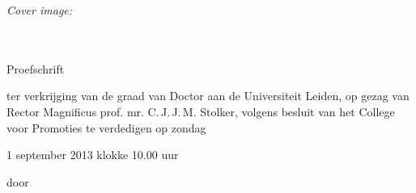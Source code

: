 \ifdefined\thesiscoverimgdesc%
\emph{Cover image:} \thesiscoverimgdesc\\
\fi
\clearpage


\begin{center}
  {
    {\Huge \thesistitle }\\[1em]
    {\huge \thesissubtitle }\\[5em]
    {\Large Proefschrift}\\[5em]
    {\Large \parbox{0.59 \textwidth}{ter verkrijging van de graad van Doctor aan de Universiteit Leiden, op gezag van Rector Magnificus prof\@. mr\@. C.\,J.\,J.\,M\@. Stolker,
volgens besluit van het College voor Promoties
te verdedigen op zondag \linebreak\centerline{1 september 2013 klokke 10.00 uur}}}\vfill
	{\Large door}\\[3em]
	{\parbox[c][][c]{0.65 \textwidth}{\centering\Large\thesisauthor\\ \thesisauthorborn}}
  }
\end{center}

\clearpage

{%
\large%
\hspace{3.6cm}\parbox[t]{0.7\textwidth}{%
\thesispromotores}\\[1cm]
}
{%
\ifdefined\thesiscomittee%
\large%
\hspace{3.6cm}\parbox[t]{0.7\textwidth}{%
\thesiscomittee}
\fi
}
\vfill

{\thesisfunding}

\clearpage


\begin{center}
  \vspace*{0.25\textheight}
  
  \emph{\thesisproverb}
  
  \vspace*{0.5\textheight}

  \emph{\thesisdedication}
\end{center}


\thesisgeometry
\checkandfixthelayout
\makeatletter
\ch@ngetext
\makeatletter
\cleardoublepage

\hypersetup{pageanchor=true}

\setcounter{tocdepth}{1}
\hypertarget{thesistoc}{}
\tableofcontents

\pagestyle{thesisstyle}
\mainmatter
\cleardoublepage
